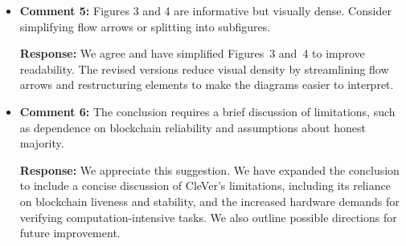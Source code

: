\documentclass[3p]{elsarticle}
\theoremstyle{remark}
\begin{document}
\begin{itemize}
    \item \textbf{Comment 5:}
    Figures 3 and 4 are informative but visually dense. 
    Consider simplifying flow arrows or splitting into subfigures.

    \textbf{Response:}
    We agree and have simplified Figures~3 and~4 to improve readability. 
    The revised versions reduce visual density by streamlining flow arrows and restructuring elements to make the diagrams easier to interpret.

    \item \textbf{Comment 6:}
    The conclusion requires a brief discussion of limitations, such as 
    dependence on blockchain reliability and assumptions about honest majority.

    \textbf{Response:}
    We appreciate this suggestion. 
    We have expanded the conclusion to include a concise discussion of 
    CleVer’s limitations, including its reliance on blockchain liveness 
    and stability, and the increased hardware demands for verifying 
    computation-intensive tasks. We also outline possible directions for future improvement.

\end{itemize}
\end{document}
